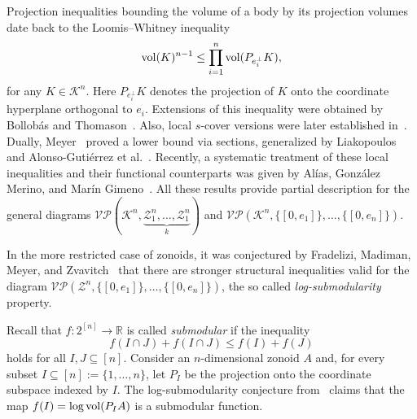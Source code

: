 \documentclass[11pt]{amsart}
\newcommand{\KSays}[1] {\textcolor{brilliantrose}{\bfseries #1 } \normalfont}
\newcommand{\R}{\mathbb R}
\newcommand{\K}{\mathcal K}
\newcommand{\VP}{\mathcal{VP}}
\newcommand{\cK}{\mathcal K}
\newcommand{\Z}{\mathcal Z}
\def\vol{{\rm vol}}
\theoremstyle{definition}
\theoremstyle{remark}
\begin{document}



Projection inequalities bounding the volume of a body by its projection volumes date back to the Loomis--Whitney inequality~\cite{LW}
\[
\vol(K)^{n-1} \le \prod_{i=1}^{n} \vol(P_{e_i^\perp} K),
\]
for any $K\in\cK^n$. Here $P_{e_i^\perp}K$ denotes the projection of $K$ onto the coordinate hyperplane orthogonal to $e_i$.
Extensions of this inequality were obtained by Bollobás and Thomason~\cite{BT}. Also, local $s$-cover versions were later established in~\cite{ABBC, MNZ}. Dually, Meyer~\cite{M} proved a lower bound via sections, generalized by Liakopoulos~\cite{L} and Alonso-Gutiérrez et al.~\cite{ABBC, AAGJMR}. Recently, a systematic treatment of these local inequalities and their functional counterparts was given by Alías, González Merino, and Marín Gimeno~\cite{AGM}. 
All these results provide partial description for the general diagrams $\VP(\K^n,\underbrace{\Z_1^n,\dots, \Z_1^n}_{k})$ and $\VP(\K^n, \{[0,e_1]\},\dots, \{[0,e_n]\})$.

In the more restricted case of zonoids, it was conjectured by Fradelizi, Madiman, Meyer, and Zvavitch~\cite{FMMZ} that there are stronger structural inequalities valid for the diagram $\VP(\Z^n, \{[0,e_1]\},\dots, \{[0,e_n]\})$, the so called {\it log-submodularity} property.

Recall that $f : 2^{ [n]} \to \R$ is called {\it submodular} if the inequality 
\[
	f(I \cap J) + f(I \cap J) \le f(I) + f(J) 
\]
holds for all $I, J \subseteq [n]$. Consider an $n$-dimensional zonoid $A$  and, for every subset $I \subseteq [n]:=\{1,\ldots,n\}$, let $P_I$ be the projection onto the coordinate subspace indexed by $I$. The log-submodularity conjecture from~\cite{FMMZ}  claims that the map $f(I) =  \log \vol(P_I A)$ is a submodular function. 
\end{document}
